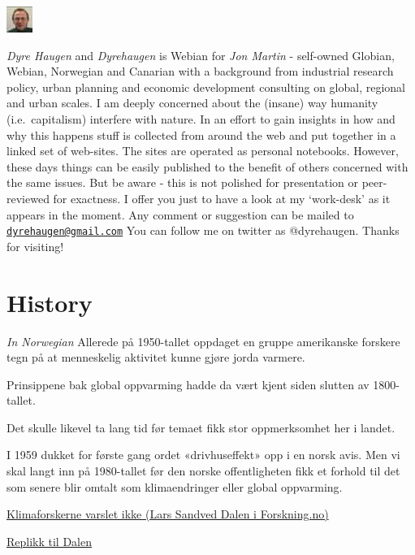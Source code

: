 \documentclass[
]{book}
\begin{document}
\includegraphics{fig/me.jpg}

\emph{Dyre Haugen} and \emph{Dyrehaugen} is Webian for \emph{Jon Martin} -
self-owned Globian, Webian, Norwegian and Canarian with
a background from industrial research policy, urban planning and
economic development consulting on global, regional and urban scales.
I am deeply concerned about the (insane) way
humanity (i.e.~capitalism) interfere with nature.
In an effort to gain insights in how and why this happens
stuff is collected from around the web and put together
in a linked set of web-sites.
The sites are operated as personal notebooks.
However, these days things can be easily published to the
benefit of others concerned with the same issues.
But be aware - this is not polished for presentation or
peer-reviewed for exactness.
I offer you just to have a look at my `work-desk' as it appears in the moment.
Any comment or suggestion can be mailed to \href{mailto:dyrehaugen@gmail.com}{\nolinkurl{dyrehaugen@gmail.com}}
You can follow me on twitter as @dyrehaugen.
Thanks for visiting!

\hypertarget{history}{%
\chapter{History}\label{history}}

\emph{In Norwegian}
Allerede på 1950-tallet oppdaget en gruppe amerikanske forskere tegn på at menneskelig aktivitet kunne gjøre jorda varmere.

Prinsippene bak global oppvarming hadde da vært kjent siden slutten av 1800-tallet.

Det skulle likevel ta lang tid før temaet fikk stor oppmerksomhet her i landet.

I 1959 dukket for første gang ordet «drivhuseffekt» opp i en norsk avis. Men vi skal langt inn på 1980-tallet før den norske offentligheten fikk et forhold til det som senere blir omtalt som klimaendringer eller global oppvarming.

\href{https://forskning.no/media/hvorfor-varslet-ikke-norske-forskere-om-klimaendringene-tidligere/1795682}{Klimaforskerne varslet ikke (Lars Sandved Dalen i Forskning.no)}

\href{https://forskersonen.no/klima-kronikk-meninger/hvor-skrasikre-kunne-forskerne-egentlig-vaere-om-klimaendringene-for-90-tallet/1802246}{Replikk til Dalen}
\end{document}
